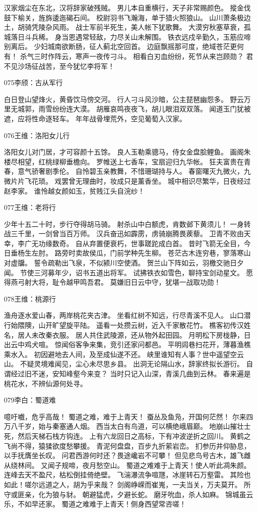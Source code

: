 汉家烟尘在东北，汉将辞家破残贼。
男儿本自重横行，天子非常赐颜色。
摐金伐鼓下榆关，旌旆逶迤碣石间。
校尉羽书飞瀚海，单于猎火照狼山。
山川萧条极边土，胡骑凭陵杂风雨。
战士军前半死生，美人帐下犹歌舞。
大漠穷秋塞草衰，孤城落日斗兵稀。
身当恩遇常轻敌，力尽关山未解围。
铁衣远戍辛勤久，玉筋应啼别离后。
少妇城南欲断肠，征人蓟北空回首。
边庭飘摇那可度，绝域苍茫更何有！
杀气三时作阵云，寒声一夜传刁斗。
相看白刃血纷纷，死节从来岂顾勋？
君不见沙场征战苦，至今犹忆李将军！

075李颀：古从军行

白日登山望烽火，黄昏饮马傍交河。
行人刁斗风沙暗，公主琵琶幽怨多。
野云万里无城郭，雨雪纷纷连大漠。
胡雁哀鸣夜夜飞，胡儿眼泪双双落。
闻道玉门犹被遮，应将性命逐轻车。
年年战骨埋荒外，空见葡萄入汉家。

076王维：洛阳女儿行

洛阳女儿对门居，才可容颜十五馀。
良人玉勒乘骢马，侍女金盘脍鲤鱼。
画阁朱楼尽相望，红桃绿柳垂檐向。
罗帷送上七香车，宝扇迎归九华帐。
狂夫富贵在青春，意气骄奢剧季伦。
自怜碧玉亲教舞，不惜珊瑚持与人。
春窗曙灭九微火，九微片片飞花琐。
戏罢曾无理曲时，妆成只是薰香坐。
城中相识尽繁华，日夜经过赵李家。
谁怜越女颜如玉，贫贱江头自浣纱！

077王维：老将行

少年十五二十时，步行夺得胡马骑。
射杀山中白额虎，肯数邺下黄须儿！
一身转战三千里，一剑曾当百万师。
汉兵奋迅如霹雳，虏骑崩腾畏蒺藜。
卫青不败由天幸，李广无功缘数奇。
自从弃置便衰朽，世事蹉跎成白首。
昔时飞箭无全目，今日垂杨生左肘。
路旁时卖故侯瓜，门前学种先生柳。
苍茫古木连穷巷，寥落寒山对虚牖。
誓令疏勒出飞泉，不似颍川空使酒。
贺兰山下阵如云，羽檄交驰日夕闻。
节使三河募年少，诏书五道出将军。
试拂铁衣如雪色，聊持宝剑动星文。
愿得燕弓射大将，耻令越甲鸣吾君。
莫嫌旧日云中守，犹堪一战取功勋！

078王维：桃源行

渔舟逐水爱山春，两岸桃花夹古津。
坐看红树不知远，行尽青溪不见人。
山口潜行始隈隩，山开旷望旋平陆。
遥看一处攒云树，近入千家散花竹。
樵客初传汉姓名，居人未改秦衣服。
居人共住武陵源，还从物外起田园。
月明松下房栊静，日出云中鸡犬喧。
惊闻俗客争来集，竞引还家问都邑。
平明闾巷扫花开，薄暮渔樵乘水入。
初因避地去人间，及至成仙遂不还。
峡里谁知有人事？世中遥望空云山。
不疑灵境难闻见，尘心未尽思乡县。
出洞无论隔山水，辞家终拟长游衍。
自谓经过旧不迷，安知峰壑今来变？
当时只记入山深，青溪几曲到云林。
春来遍是桃花水，不辨仙源何处寻。

079李白：蜀道难

噫吁嚱，危乎高哉！
蜀道之难，难于上青天！
蚕丛及鱼凫，开国何茫然！
尔来四万八千岁，始与秦塞通人烟。
西当太白有鸟道，可以横绝峨眉巅。
地崩山摧壮士死，然后天梯石栈方钩连。
上有六龙回日之高标，下有冲波逆折之回川。
黄鹤之飞尚不得，猿猱欲度愁攀援。
青泥何盘盘，百步九折萦岩峦。
扪参历井仰胁息，以手抚膺坐长叹。
问君西游何时还？畏途巉岩不可攀！
但见悲鸟号古木，雄飞雌从绕林间。
又闻子规啼，夜月愁空山。
蜀道之难难于上青天！使人听此凋朱颜。
连峰去天不盈尺，枯松倒挂倚绝壁。
飞湍瀑流争喧豗，冰崖转石万壑雷。
其险也如此！嗟尔远道之人，胡为乎来哉？
剑阁峥嵘而崔嵬，一夫当关，万夫莫开。
所守或匪亲，化为狼与豺。
朝避猛虎，夕避长蛇。
磨牙吮血，杀人如麻。
锦城虽云乐，不如早还家。
蜀道之难难于上青天！侧身西望常咨嗟！

